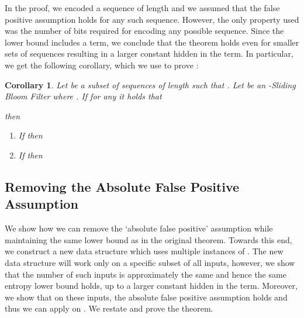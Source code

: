 \documentclass[11pt]{article}
\newtheorem{corollary}[theorem]{Corollary}
\begin{document}
In the proof, we encoded a sequence of length  and we assumed that the false positive assumption holds for any such sequence. However, the only property used was the number of bits required for encoding any possible sequence. Since the lower bound includes a  term, we conclude that the theorem holds even for smaller sets of sequences resulting in a larger constant hidden in the  term. In particular, we get the following corollary, which we use to prove :
\begin{corollary}\label{corollary1}
Let  be a subset of sequences of length  such that . Let  be an -Sliding Bloom Filter where . If for any  it holds that

then
\begin{enumerate}
\item If  then 
\item If  then 
\end{enumerate}
\end{corollary}

\subsection{Removing the Absolute False Positive Assumption}\label{RemoveAssumption}
We show how we can remove the `absolute false positive' assumption while maintaining the same lower bound as in the original theorem. Towards this end, we construct a new data structure  which uses multiple instances of . The new data structure  will work only on a specific subset of all inputs, however, we show that the number of such inputs is approximately the same and hence the same entropy lower bound holds, up to a larger constant hidden in the  term. Moreover, we show that on these inputs, the absolute false positive assumption holds and thus we can apply  on . We restate and prove the theorem.
\end{document}
